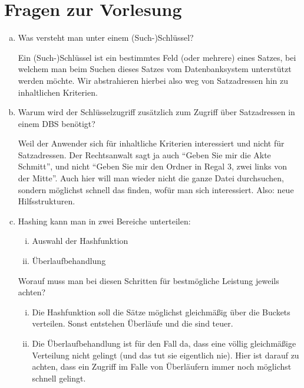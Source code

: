 \section{Fragen zur Vorlesung}

\begin{enumerate}[a)]

	\item Was versteht man unter einem (Such-)Schlüssel?

	\begin{solution}
	Ein (Such-)Schlüssel ist ein bestimmtes Feld (oder mehrere) eines Satzes, bei welchem man beim Suchen dieses Satzes vom Datenbanksystem unterstützt werden möchte. Wir abstrahieren hierbei also weg von Satzadressen hin zu inhaltlichen Kriterien.
	\end{solution}

	\item Warum wird der Schlüsselzugriff zusätzlich zum Zugriff über Satzadressen in einem DBS benötigt?

	\begin{solution}
	Weil der Anwender sich für inhaltliche Kriterien interessiert und nicht für Satzadressen.
Der Rechtsanwalt sagt ja auch "`Geben Sie mir die Akte Schmitt"'{}, und nicht "`Geben Sie mir den Ordner in Regal 3, zwei links von der Mitte"'{}. Auch hier will man wieder nicht die ganze Datei durchsuchen, sondern möglichst schnell das finden, wofür man sich interessiert. Also: neue Hilfsstrukturen.
	\end{solution}

	\item Hashing kann man in zwei Bereiche unterteilen:
	\begin{enumerate}[i)]
		\item Auswahl der Hashfunktion
		\item Überlaufbehandlung
	\end{enumerate}
	Worauf muss man bei diesen Schritten für bestmögliche Leistung jeweils achten?

	\begin{solution}
	\begin{enumerate}[i)]
		\item Die Hashfunktion soll die Sätze möglichst gleichmäßig über die Buckets verteilen. Sonst entstehen Überläufe und die sind teuer.
		\item Die Überlaufbehandlung ist für den Fall da, dass eine völlig gleichmäßige Verteilung nicht gelingt (und das tut sie eigentlich nie). Hier ist darauf zu achten, dass ein Zugriff im Falle von Überläufern immer noch möglichst schnell gelingt.
	\end{enumerate}
	\end{solution}


\end{enumerate}
